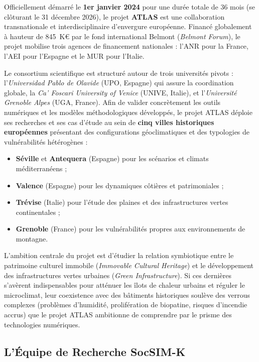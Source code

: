 \documentclass{article}
\begin{document}
Officiellement démarré le \textbf{1er janvier 2024} pour une durée totale de 36 mois (se clôturant le 31 décembre 2026), le projet \textbf{ATLAS} est une collaboration transnationale et interdisciplinaire d'envergure européenne. Financé globalement à hauteur de 845~K€ par le fond international Belmont (\textit{Belmont Forum}), le projet mobilise trois agences de financement nationales : l'ANR pour la France, l'AEI pour l'Espagne et le MUR pour l'Italie. 

Le consortium scientifique est structuré autour de trois universités pivots : l'\textit{Universidad Pablo de Olavide} (UPO, Espagne) qui assure la coordination globale, la \textit{Ca’ Foscari University of Venice} (UNIVE, Italie), et l'\textit{Université Grenoble Alpes} (UGA, France). Afin de valider concrètement les outils numériques et les modèles méthodologiques développés, le projet ATLAS déploie ses recherches et ses cas d'étude au sein de \textbf{cinq villes historiques européennes} présentant des configurations géoclimatiques et des typologies de vulnérabilités hétérogènes :
\begin{itemize}
    \item \textbf{Séville} et \textbf{Antequera} (Espagne) pour les scénarios et climats méditerranéens ;
    \item \textbf{Valence} (Espagne) pour les dynamiques côtières et patrimoniales ;
    \item \textbf{Trévise} (Italie) pour l'étude des plaines et des infrastructures vertes continentales ;
    \item \textbf{Grenoble} (France) pour les vulnérabilités propres aux environnements de montagne.
\end{itemize}

L'ambition centrale du projet est d'étudier la relation symbiotique entre le patrimoine culturel immobile (\textit{Immovable Cultural Heritage}) et le développement des infrastructures vertes urbaines (\textit{Green Infrastructure}). Si ces dernières s'avèrent indispensables pour atténuer les îlots de chaleur urbains et réguler le microclimat, leur coexistence avec des bâtiments historiques soulève des verrous complexes (problèmes d'humidité, prolifération de biopatine, risques d'incendie accrus) que le projet ATLAS ambitionne de comprendre par le prisme des technologies numériques.

\subsection{L'Équipe de Recherche SocSIM-K}
\end{document}
